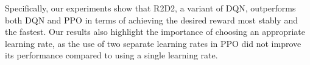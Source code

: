 \documentclass[conference]{IEEEtran}
\begin{document}
Specifically, our experiments show that R2D2, a variant of DQN, outperforms both DQN and PPO in terms of achieving the desired reward most stably and the fastest. Our results also highlight the importance of choosing an appropriate learning rate, as the use of two separate learning rates in PPO did not improve its performance compared to using a single learning rate.



	
\end{document}
